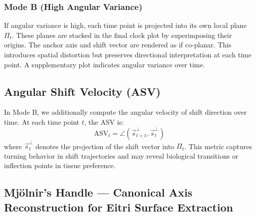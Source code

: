 \documentclass{article}
\begin{document}
\subsubsection*{Mode B (High Angular Variance)}

If angular variance is high, each time point is projected into its own local plane \( \Pi_t \). These planes are stacked in the final clock plot by superimposing their origins. The anchor axis and shift vector are rendered as if co-planar. This introduces spatial distortion but preserves directional interpretation at each time point. A supplementary plot indicates angular variance over time.

\subsection{Angular Shift Velocity (ASV)}

In Mode B, we additionally compute the angular velocity of shift direction over time. At each time point \( t \), the ASV is:
\[
\text{ASV}_t = \angle\left( \vec{s}_{t+1}^{\perp}, \vec{s}_t^{\perp} \right)
\]
where \( \vec{s}_t^{\perp} \) denotes the projection of the shift vector into \( \Pi_t \). This metric captures turning behavior in shift trajectories and may reveal biological transitions or inflection points in tissue preference.

\subsection{Mjölnir's Handle — Canonical Axis Reconstruction for Eitri Surface Extraction}
\label{sec:semantic_axis}
\end{document}

